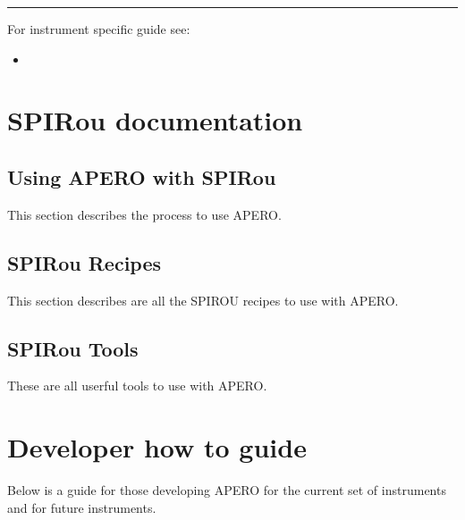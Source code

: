 \documentclass[a4paper,10pt,english]{report}
\begin{document}
\bigskip\hrule\bigskip


For instrument specific guide see:
\begin{itemize}
\item {} 
{\hyperref[\detokenize{user/spirou:spirou-main}]{}}

\end{itemize}


\section{SPIRou documentation}
\label{\detokenize{user/spirou:spirou-documentation}}\label{\detokenize{user/spirou:spirou-main}}\label{\detokenize{user/spirou::doc}}

\subsection{Using APERO with SPIRou}
\label{\detokenize{user/spirou/using_apero_spirou:using-apero-with-spirou}}\label{\detokenize{user/spirou/using_apero_spirou:using-apero-spirou}}\label{\detokenize{user/spirou/using_apero_spirou::doc}}
This section describes the process to use APERO.


\subsection{SPIRou Recipes}
\label{\detokenize{user/spirou/recipes_spirou:spirou-recipes}}\label{\detokenize{user/spirou/recipes_spirou:recipes-spirou}}\label{\detokenize{user/spirou/recipes_spirou::doc}}
This section describes are all the SPIROU recipes to use with APERO.


\subsection{SPIRou Tools}
\label{\detokenize{user/spirou/tools_spirou:spirou-tools}}\label{\detokenize{user/spirou/tools_spirou:tools-spirou}}\label{\detokenize{user/spirou/tools_spirou::doc}}
These are all userful tools to use with APERO.


\section{Developer how to guide}
\label{\detokenize{dev/developer_guide:developer-how-to-guide}}\label{\detokenize{dev/developer_guide:dev-main}}\label{\detokenize{dev/developer_guide::doc}}
Below is a guide for those developing APERO for the current set of instruments
and for future instruments.
\end{document}
